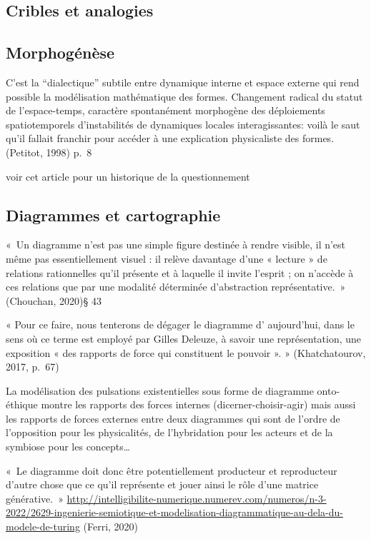 \documentclass[
  letterpaper,
  DIV=11,
  numbers=noendperiod]{scrreprt}
\begin{document}
\hypertarget{cribles-et-analogies}{%
\subsection{Cribles et analogies}\label{cribles-et-analogies}}

\hypertarget{morphoguxe9nuxe8se}{%
\subsection{Morphogénèse}\label{morphoguxe9nuxe8se}}

C'est la ``dialectique'' subtile entre dynamique interne et espace
externe qui rend possible la modélisation mathématique des formes.
Changement radical du statut de l'espace-temps, caractère spontanément
morphogène des déploiements spatiotemporels d'instabilités de dynamiques
locales interagissantes: voilà le saut qu'il fallait franchir pour
accéder à une explication physicaliste des formes. (Petitot, 1998) p.~8

voir cet article pour un historique de la questionnement

\hypertarget{diagrammes-et-cartographie}{%
\subsection{Diagrammes et
cartographie}\label{diagrammes-et-cartographie}}

«~Un diagramme n'est pas une simple figure destinée à rendre visible, il
n'est même pas essentiellement visuel : il relève davantage d'une «
lecture » de relations rationnelles qu'il présente et à laquelle il
invite l'esprit ; on n'accède à ces relations que par une modalité
déterminée d'abstraction représentative.~» (Chouchan, 2020)§ 43

« Pour ce faire, nous tenterons de dégager le diagramme d' aujourd'hui,
dans le sens où ce terme est employé par Gilles Deleuze, à savoir une
représentation, une exposition « des rapports de force qui constituent
le pouvoir ». » (Khatchatourov, 2017, p.~67)

La modélisation des pulsations existentielles sous forme de diagramme
onto-éthique montre les rapports des forces internes
(dicerner-choisir-agir) mais aussi les rapports de forces externes entre
deux diagrammes qui sont de l'ordre de l'opposition pour les
physicalités, de l'hybridation pour les acteurs et de la symbiose pour
les concepts\ldots{}

«~Le diagramme doit donc être potentiellement producteur et reproducteur
d'autre chose que ce qu'il représente et jouer ainsi le rôle d'une
matrice générative.~»
\url{http://intelligibilite-numerique.numerev.com/numeros/n-3-2022/2629-ingenierie-semiotique-et-modelisation-diagrammatique-au-dela-du-modele-de-turing}
(Ferri, 2020)
\end{document}
